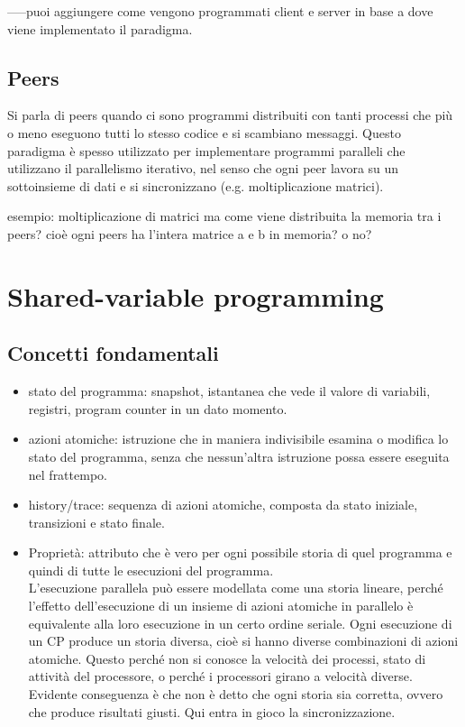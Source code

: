 \documentclass[10pt,a4paper]{article}
\begin{document}
-----puoi aggiungere come vengono programmati client e server in base a dove viene implementato il paradigma.

\subsection{Peers}
Si parla di peers quando ci sono programmi distribuiti con tanti processi che più o meno eseguono tutti lo stesso codice e si scambiano messaggi. Questo paradigma è spesso utilizzato per implementare programmi paralleli che utilizzano il parallelismo iterativo, nel senso che ogni peer lavora su un sottoinsieme di dati e si sincronizzano (e.g. moltiplicazione matrici).

esempio: moltiplicazione di matrici ma come viene distribuita la memoria tra i peers? cioè ogni peers ha l'intera matrice a e b in memoria? o no?




\section{Shared-variable programming}
\subsection{Concetti fondamentali}
\begin{itemize}
\item stato del programma: snapshot, istantanea che vede il valore di variabili, registri, program counter in un dato momento.
\item azioni atomiche: istruzione che in maniera indivisibile esamina o modifica lo stato del programma, senza che nessun'altra istruzione possa essere eseguita nel frattempo.
\item history/trace: sequenza di azioni atomiche, composta da stato iniziale, transizioni e stato finale.
\item Proprietà: attributo che è vero per ogni possibile storia di quel programma e quindi di tutte le esecuzioni del programma.\\
 L'esecuzione parallela può essere modellata come una storia lineare, perché l'effetto dell'esecuzione di un insieme di azioni atomiche in parallelo è equivalente alla loro esecuzione in un certo ordine seriale.
Ogni esecuzione di un CP produce un storia diversa, cioè si hanno diverse combinazioni di azioni atomiche. Questo perché non si conosce la velocità dei processi, stato di attività del processore, o perché i processori girano a velocità diverse. Evidente conseguenza è che non è detto che ogni storia sia corretta, ovvero che produce risultati giusti. Qui entra in gioco la sincronizzazione.
\end{itemize}
\end{document}
